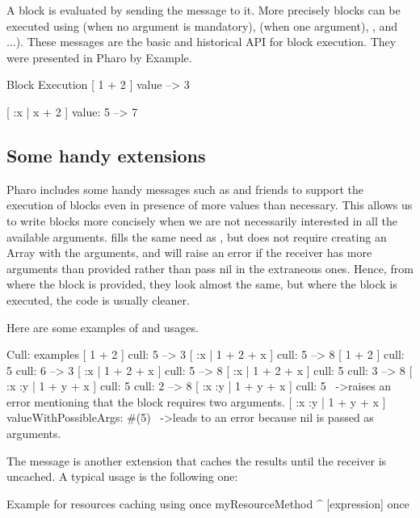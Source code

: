 \documentclass[a4paper,10pt,twoside]{book}
\begin{document}
 A block is evaluated by sending the  message to it. More precisely blocks can be executed using  (when no argument is mandatory),  (when one argument), ,   and ...). These messages are the basic and historical API for block execution. They were presented in Pharo by Example. 
 

\begin{code}{Block Execution}
[ 1 + 2 ] value  
    --> 3
    
[ :x | x + 2 ] value: 5
    --> 7
\end{code}

\subsection{Some handy extensions}
Pharo includes some handy messages such as  and friends to support the execution of blocks even in presence of more values than necessary. This allows us to write blocks more concisely when we are not necessarily interested in all the available arguments.
 fills the same need as  , but does not require creating an Array with the arguments, and will raise an error if the receiver has more arguments than provided rather than pass nil in the extraneous ones. 
Hence, from where the block is provided, they look almost the same, but where the block is executed, the code is usually cleaner.

Here are some examples of  and   usages.
\begin{code}{Cull: examples}
[ 1 + 2 ] cull: 5
	--> 3
[ :x | 1 + 2 + x ] cull: 5 
	--> 8
[ 1 + 2 ] cull: 5 cull: 6
	--> 3
[ :x | 1 + 2 + x ] cull: 5 
	--> 8
[ :x | 1 + 2 + x ] cull: 5 cull: 3	
	--> 8 
[ :x :y | 1 + y + x ] cull: 5 cull: 2 
	--> 8
[ :x :y | 1 + y + x ] cull: 5 
	~->raises an error mentioning that the block requires two arguments.
[ :x :y | 1 + y + x ] valueWithPossibleArgs: #(5) 
	~->leads to an error because nil is passed as arguments.	
\end{code}

The message  is another extension that caches the results until the receiver is uncached. A typical usage is the following one:

\begin{method}{Example for resources caching using once}
myResourceMethod
	^ [expression] once
\end{method}
\end{document}
